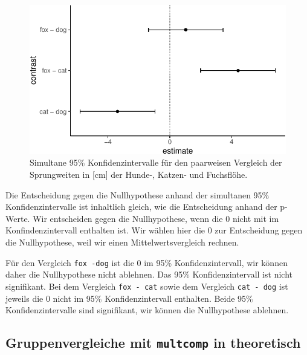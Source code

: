 \documentclass[
  letterpaper,
  DIV=11,
  oneside]{scrreport}
\begin{document}
\begin{figure}[H]

{\centering \includegraphics{./stat-tests-posthoc_files/figure-pdf/fig-multcomp-1-1.pdf}

}

\caption{\label{fig-multcomp-1}Simultane 95\% Konfidenzintervalle für
den paarweisen Vergleich der Sprungweiten in {[}cm{]} der Hunde-,
Katzen- und Fuchsflöhe.}

\end{figure}

Die Entscheidung gegen die Nullhypothese anhand der simultanen 95\%
Konfidenzintervalle ist inhaltlich gleich, wie die Entscheidung anhand
der p-Werte. Wir entscheiden gegen die Nullhypothese, wenn die 0 nicht
mit im Konfindenzintervall enthalten ist. Wir wählen hier die 0 zur
Entscheidung gegen die Nullhypothese, weil wir einen
Mittelwertsvergleich rechnen.

Für den Vergleich \texttt{fox\ -dog} ist die 0 im 95\%
Konfidenzintervall, wir können daher die Nullhypothese nicht ablehnen.
Das 95\% Konfidenzintervall ist nicht signifikant. Bei dem Vergleich
\texttt{fox\ -\ cat} sowie dem Vergleich \texttt{cat\ -\ dog} ist
jeweils die 0 nicht im 95\% Konfidenzintervall enthalten. Beide 95\%
Konfidenzintervalle sind signifikant, wir können die Nullhypothese
ablehnen.

\hypertarget{gruppenvergleiche-mit-multcomp-in-theoretisch}{%
\subsection{\texorpdfstring{Gruppenvergleiche mit \texttt{multcomp} in
theoretisch}{Gruppenvergleiche mit multcomp in theoretisch}}\label{gruppenvergleiche-mit-multcomp-in-theoretisch}}
\end{document}
